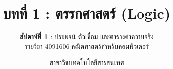 
\renewcommand{\footchaptertitle}{บทที่ 1 ตรรกศาสตร์ (สัปดาห์ที่ 1)}

\title{\textbf{บทที่ 1 : ตรรกศาสตร์ (Logic)}}
\subtitle{\textbf{สัปดาห์ที่ 1} : ประพจน์ ตัวเชื่อม และตารางค่าความจริง \\ รายวิชา 4091606 คณิตศาสตร์สำหรับคอมพิวเตอร์}
\author{สาขาวิชาเทคโนโลยีสารสนเทศ}
\date{}




